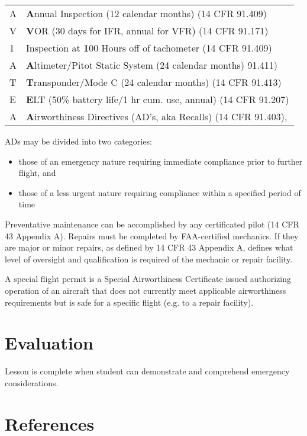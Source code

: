 \documentclass[twoside,openright]{report}
\begin{document}
\begin{table}[h]
\centering
\begin{tabular}{ll}
A & \textbf{A}nnual Inspection (12 calendar months) (14 CFR 91.409)        \\
V & \textbf{V}OR (30 days for IFR, annual for VFR) (14 CFR 91.171)         \\
1 & Inspection at \textbf{1}00 Hours off of tachometer (14 CFR 91.409)     \\
A & \textbf{A}ltimeter/Pitot Static System (24 calendar months) 91.411)    \\
T & \textbf{T}ransponder/Mode C (24 calendar months) (14 CFR 91.413)       \\
E & \textbf{E}LT (50\% battery life/1 hr cum. use, annual) (14 CFR 91.207) \\
A & \textbf{A}irworthiness Directives (AD’s, aka Recalls) (14 CFR 91.403),
\end{tabular}
\end{table}

ADs may be divided into two categories:
\begin{itemize}
  \item those of an emergency nature requiring immediate compliance prior to
    further flight, and

  \item those of a less urgent nature requiring compliance within a specified
    period of time
\end{itemize}

Preventative maintenance can be accomplished by any certificated pilot (14 CFR
43 Appendix A). Repairs must be completed by FAA-certified mechanics. If they
are major or minor repairs, as defined by 14 CFR 43 Appendix A, defines what
level of oversight and qualification is required of the mechanic or repair
facility.

A special flight permit is a Special Airworthiness Certificate issued
authorizing operation of an aircraft that does not currently meet applicable
airworthiness requirements but is safe for a specific flight (e.g. to a repair
facility).

\section{Evaluation}

Lesson is complete when student can demonstrate and comprehend emergency
considerations.

\section{References}
\end{document}
